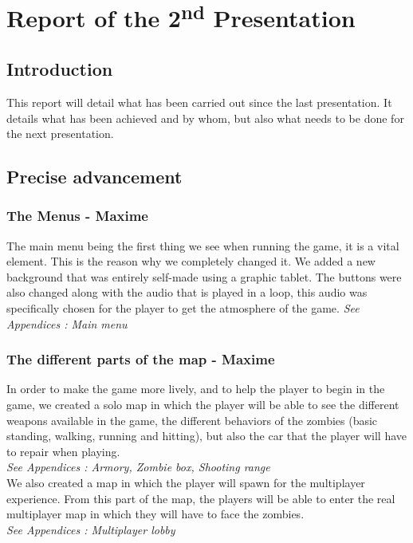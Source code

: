\documentclass[12pt]{article}
\newcommand{\ts}{\textsuperscript}
\begin{document}
\section{Report of the 2\ts{nd} Presentation}

\subsection{Introduction}
	This report will detail what has been carried out since the last presentation. It details what has been achieved and by whom, but also what needs to be done for the next presentation.
    
\bigskip
\subsection{Precise advancement}
\bigskip
	\subsubsection{The Menus - Maxime}

		The main menu being the first thing we see when running the game, it is a vital element. This is the reason why we completely changed it. We added a new background that was entirely self-made using a graphic tablet. The buttons were also changed along with the audio that is played in a loop, this audio was specifically chosen for the player to get the atmosphere of the game.
\textit{See Appendices : Main menu}
  
        
\bigskip
    \subsubsection{The different parts of the map - Maxime}
    
    	In order to make the game more lively, and to help the player to begin in the game, we created a solo map in which the player will be able to see the different weapons available in the game, the different behaviors of the zombies (basic standing, walking, running and hitting), but also the car that the player will have to repair when playing.\\
\textit{See Appendices : Armory, Zombie box, Shooting range}\\
        
        We also created a map in which the player will spawn for the multiplayer experience. From this part of the map, the players will be able to enter the real multiplayer map in which they will have to face the zombies.\\
\textit{See Appendices : Multiplayer lobby}
        
\end{document}
